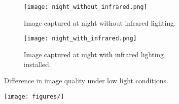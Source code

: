 \begin{figure}
	\begin{subfigure}{0.95\textwidth}
		\texttt{[image: night\_without\_infrared.png]}
		\caption{Image captured at night without infrared lighting.}\label{fig:night_without_infrared}
	\end{subfigure}
    \br
	\begin{subfigure}{0.95\textwidth}
		\texttt{[image: night\_with\_infrared.png]}
		\caption{Image captured at night with infrared lighting installed.}\label{fig:night_with_infrared}
	\end{subfigure}

	\caption{Difference in image quality under low light conditions.}\label{fig:low_light_conditions}
\end{figure}

\begin{figure}
    \begin{center}
        \texttt{[image: figures/]}
    \end{center}
    \caption{}\label{fig:}
\end{figure}





